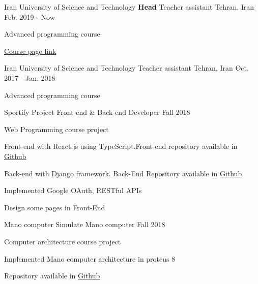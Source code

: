 

\begin{cventries}

  \cventry
  {Iran University of Science and Technology} %
  {\textbf{Head} Teacher assistant} %
  {Tehran, Iran} %
  {Feb. 2019 - Now} %
  {
    \begin{cvitems}
      \item 
      Advanced programming course
      \item
      \textcolor{blue}{\href{https://sauleh.github.io/ap97/}{Course page link}}
    \end{cvitems}
  }

  \cventry
  {Iran University of Science and Technology} %
  {Teacher assistant} %
  {Tehran, Iran} %
  {Oct. 2017 - Jan. 2018} %
  {
    \begin{cvitems}
      \item 
      Advanced programming course
    \end{cvitems}
  }

  \cventry
  {Sportify Project} %
  {Front-end \& Back-end Developer} %
  {} %
  {Fall 2018} %
  {
    \begin{cvitems} %
      \item {Web Programming course project}
      \item {Front-end with React.js using TypeScript.Front-end repository available in \href{https://github.com/ali4heydari/sportify-frontend}{Github}}
      \item {Back-end with Django framework. Back-End Repository available in \href{https://github.com/ali4heydari/sportify-backend}{Github}}
      \item {Implemented Google OAuth, RESTful APIs}
      \item {Design some pages in Front-End}
    \end{cvitems}
  }


  \cventry
  {Mano computer} %
  {Simulate Mano computer} %
  {} %
  {Fall 2018} %
  {
    \begin{cvitems} %
      \item {Computer architecture course project}
      \item {Implemented Mano computer architecture in proteus 8}
      \item {Repository available in \href{https://github.com/ali4heydari/ManoComputer}{Github}}
    \end{cvitems}
  }


\end{cventries}
